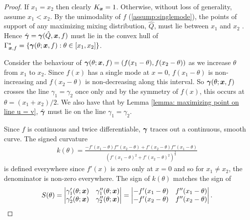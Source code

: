 		\label{sec:proof of n=2 inflection result}
		\begin{proof}
			If $x_1 = x_2$ then clearly $K_{\bm{{x}}} = 1$. Otherwise, without loss of generality, assume $x_1 < x_2$. By the unimodality of $f$ (\ref{assump:singlemode}), the points of support of any maximizing mixing distribution, $\hat{Q}$, must lie between $x_1$ and $x_2$ \cite[Proposition 25]{Lindsay1995-sq}. Hence $\hat{{\bm{{\gamma}}}} = {\bm{{\gamma}}}(\hat{Q}, {\bm{{x}}}, f)$ must lie in the convex hull of $\Gamma^*_{{\bm{{x}}}, f} = \{{\bm{{\gamma}}}(\theta; {\bm{{x}}}, f) : \theta \in [x_1, x_2]\}$. 

			Consider the behaviour of ${\bm{{\gamma}}}(\theta; {\bm{{x}}}, f) = (f(x_1 - \theta), f(x_2 - \theta))$ as we increase $\theta$ from $x_1$ to $x_2$. Since $f(x)$ has a single mode at $x = 0$, $f(x_1 - \theta)$ is non-increasing and $f(x_2 - \theta)$ is non-decreasing along this interval. So ${\bm{{\gamma}}}(\theta;{\bm{{x}}}, f)$ crosses the line $\gamma_1 = \gamma_2$ once only and by the symmetry of $f(x)$, this occurs at $\theta = (x_1 + x_2)/2$. We also have that by Lemma \ref{lemma: maximizing point on line u = v}, $\hat{{\bm{{\gamma}}}}$ must lie on the line $\gamma_1 = \gamma_2$.

			Since $f$ is continuous and twice differentiable, ${\bm{{\gamma}}}$ traces out a continuous, smooth curve. The signed curvature
			\begin{align}
				k(\theta) = \frac{-f'(x_1 - \theta)f''(x_2 - \theta) + f'(x_2 - \theta)f''(x_1 - \theta)}{(f'(x_1 - \theta)^2 + f'(x_2 - \theta)^2)^{\frac{3}{2}}}
			\end{align}
			is defined everywhere since $f'(x)$ is zero only at $x = 0$ and so for $x_1 \neq x_2$, the denominator is non-zero everywhere. The sign of $k(\theta)$ matches the sign of
			\begin{equation}
				S(\theta) = 
				\begin{vmatrix}
					\gamma_1'(\theta;{\bm{{x}}})&\gamma_1''(\theta;{\bm{{x}}})\\
					\gamma_2'(\theta;{\bm{{x}}})&\gamma_2''(\theta;{\bm{{x}}})
				\end{vmatrix} = 
				\begin{vmatrix}
					-f'(x_1 - \theta) & f''(x_1 - \theta)\\
					-f'(x_2 - \theta) & f''(x_2 - \theta)
				\end{vmatrix}.
			\end{equation}


\end{proof}
